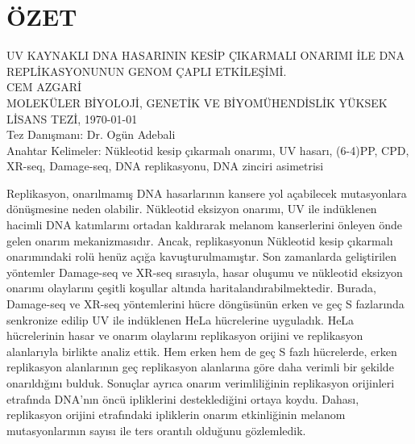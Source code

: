 \chapter*{\vspace{-4\baselineskip} \bf ÖZET} 
\begin{otherlanguage}{turkish}
\begin{center}
\MakeUppercase{UV KAYNAKLI DNA HASARININ KESİP ÇIKARMALI ONARIMI İLE DNA REPLİKASYONUNUN GENOM ÇAPLI ETKİLEŞİMİ.} \\[3\baselineskip]
\MakeUppercase{CEM AZGARİ} \\[\baselineskip]
MOLEKÜLER BİYOLOJİ, GENETİK VE BİYOMÜHENDİSLİK YÜKSEK LİSANS TEZİ, \Cemdateformat\today \\[\baselineskip]
Tez Danışmanı: Dr. Ogün Adebali \\[2\baselineskip]
Anahtar Kelimeler: Nükleotid kesip çıkarmalı onarımı, UV hasarı, (6-4)PP, CPD, XR-seq, Damage-seq, DNA replikasyonu, DNA zinciri asimetrisi \\[2\baselineskip]
\end{center}

\singlespacing
Replikasyon, onarılmamış DNA hasarlarının kansere yol açabilecek mutasyonlara dönüşmesine neden olabilir. Nükleotid eksizyon onarımı, UV ile indüklenen hacimli DNA katımlarını ortadan kaldırarak melanom kanserlerini önleyen önde gelen onarım mekanizmasıdır. Ancak, replikasyonun Nükleotid kesip çıkarmalı onarımındaki rolü henüz açığa kavuşturulmamıştır. Son zamanlarda geliştirilen yöntemler Damage-seq ve XR-seq sırasıyla, hasar oluşumu ve nükleotid eksizyon onarımı olaylarını çeşitli koşullar altında haritalandırabilmektedir. Burada, Damage-seq ve XR-seq yöntemlerini hücre döngüsünün erken ve geç S fazlarında senkronize edilip UV ile indüklenen HeLa hücrelerine uyguladık. HeLa hücrelerinin hasar ve onarım olaylarını replikasyon orijini ve replikasyon alanlarıyla birlikte analiz ettik. Hem erken hem de geç S fazlı hücrelerde, erken replikasyon alanlarının geç replikasyon alanlarına göre daha verimli bir şekilde onarıldığını bulduk. Sonuçlar ayrıca onarım verimliliğinin replikasyon orijinleri etrafında DNA'nın öncü ipliklerini desteklediğini ortaya koydu. Dahası, replikasyon orijini etrafındaki ipliklerin onarım etkinliğinin melanom mutasyonlarının sayısı ile ters orantılı olduğunu gözlemledik.

\end{otherlanguage}

\clearpage\pagebreak
\onehalfspacing